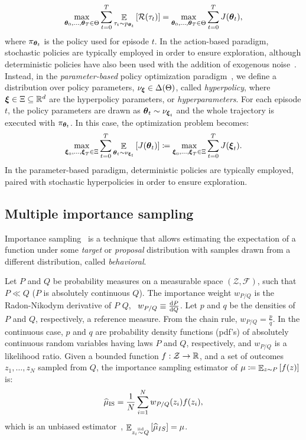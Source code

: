 \documentclass{article}
\begin{document}
\begin{align}\label{eq:Jtheta}
	\max_{\boldsymbol{\theta}_0,\dots,\boldsymbol{\theta}_T\in\Theta} \sum_{t=0}^T \mathop{\mathbb{E}}_{\tau_t\sim p_{\boldsymbol{\theta}_t}}\left[\mathcal{R}(\tau_t)\right] = 
	\max_{\boldsymbol{\theta}_0,\dots,\boldsymbol{\theta}_T\in\Theta} \sum_{t=0}^TJ(\boldsymbol{\theta}_t),
\end{align}
where $\pi_{\boldsymbol{\theta}_t}$ is the policy used for episode $t$.
In the action-based paradigm, stochastic policies are typically employed in order to ensure exploration, although deterministic policies have also been used with the addition of exogenous noise~\citep{silver2014deterministic}.
Instead, in the \textit{parameter-based} policy optimization paradigm~\citep{sehnke2008policy}, we define a distribution over policy parameters, $\nu_{\boldsymbol{\xi}}\in\Delta(\Theta)$, called \textit{hyperpolicy}, where $\boldsymbol{\xi}\in\Xi\subseteq\mathbb{R}^d$ are the hyperpolicy parameters, or \textit{hyperparameters}. For each episode $t$, the policy parameters are drawn as $\boldsymbol{\theta}_t\sim\nu_{\boldsymbol{\xi}_t}$ and the whole trajectory is executed with $\pi_{\boldsymbol{\theta}_t}$. In this case, the optimization problem becomes:
\begin{align}\label{eq:Jx}
	\max_{\boldsymbol{\xi}_0,\dots,\boldsymbol{\xi}_T\in\Xi} \sum_{t=0}^T\mathop{\mathbb{E}}_{\boldsymbol{\theta}_t\sim\nu_{\boldsymbol{\xi}_t}}\left[J(\boldsymbol{\theta}_t)\right] \coloneqq \max_{\boldsymbol{\xi}_0,\dots,\boldsymbol{\xi}_T\in\Xi} \sum_{t=0}^T J(\boldsymbol{\xi}_t).
\end{align}
In the parameter-based paradigm, deterministic policies are typically employed, paired with stochastic hyperpolicies in order to ensure exploration.

\subsection{Multiple importance sampling}
Importance sampling~\citep{cochran2007sampling,mcbook} is a technique that allows estimating the expectation of a function under some \textit{target} or \textit{proposal} distribution with samples drawn from a different distribution, called \textit{behavioral}. 

Let $P$ and $Q$ be probability measures on a measurable space $(\mathcal{Z}, \mathcal{F})$, such that $P\ll Q$ (\ie $P$ is absolutely continuous \wrt $Q$). The importance weight $w_{P/Q}$ is the Radon-Nikodym derivative of $P$ \wrt $Q$, \ie~$w_{P/Q} \equiv \frac{\mathrm{d} P}{\mathrm{d} Q}$. Let $p$ and $q$ be the densities of $P$ and $Q$, respectively, \wrt a reference measure. From the chain rule, $w_{P/Q} = \frac{p}{q}$. In the continuous case, $p$ and $q$ are probability density functions (pdf's) of absolutely continuous random variables having laws $P$ and $Q$, respectively, and $w_{P/Q}$ is a likelihood ratio. 
Given a bounded function $f:\mathcal{Z}\to\mathbb{R}$, and a set of \iid outcomes $z_1,\dots,z_N$ sampled from $Q$, the importance sampling estimator of $\mu\coloneqq\mathop{\mathbb{E}}_{z\sim P}\left[f(z)\right]$ is:
\begin{align}\label{eq:ise}
	\widehat{\mu}_{\text{IS}} = \frac{1}{N}\sum_{i=1}^{N}w_{P/Q}(z_i) f(z_i),
\end{align}
which is an unbiased estimator~\cite{mcbook}, \ie ${\mathop{\mathbb{E}}_{z_i\stackrel{\text{iid}}{\sim} Q}\left[\widehat{\mu}_{IS}\right] = \mu}$. 
\end{document}
